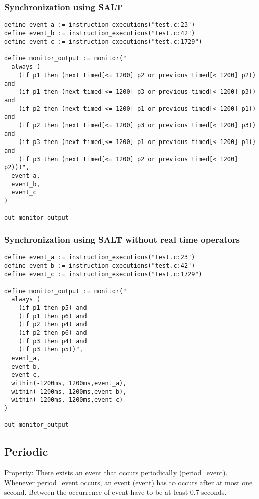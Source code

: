 \subsubsection{Synchronization using SALT}

\begin{lstlisting}[language=tessla+salt]
define event_a := instruction_executions("test.c:23")
define event_b := instruction_executions("test.c:42")
define event_c := instruction_executions("test.c:1729")

define monitor_output := monitor("
  always (
    (if p1 then (next timed[<= 1200] p2 or previous timed[< 1200] p2)) and
    (if p1 then (next timed[<= 1200] p3 or previous timed[< 1200] p3)) and
    (if p2 then (next timed[<= 1200] p1 or previous timed[< 1200] p1)) and
    (if p2 then (next timed[<= 1200] p3 or previous timed[< 1200] p3)) and
    (if p3 then (next timed[<= 1200] p1 or previous timed[< 1200] p1)) and
    (if p3 then (next timed[<= 1200] p2 or previous timed[< 1200] p2)))", 
  event_a, 
  event_b, 
  event_c
)

out monitor_output
\end{lstlisting}

\subsubsection{Synchronization using SALT without real time operators}

\begin{lstlisting}[language=tessla+salt]
define event_a := instruction_executions("test.c:23")
define event_b := instruction_executions("test.c:42")
define event_c := instruction_executions("test.c:1729")

define monitor_output := monitor("
  always (
    (if p1 then p5) and
    (if p1 then p6) and
    (if p2 then p4) and
    (if p2 then p6) and
    (if p3 then p4) and
    (if p3 then p5))",
  event_a,
  event_b,
  event_c,
  within(-1200ms, 1200ms,event_a),
  within(-1200ms, 1200ms,event_b),
  within(-1200ms, 1200ms,event_c)
)

out monitor_output
\end{lstlisting}

\subsection{Periodic}

Property: There exists an event that occurs periodically (period\_event). Whenever period\_event occurs, 
an event (event) has to occurs after at most one second. Between the occurrence of event have to be at least 0.7 seconds.

